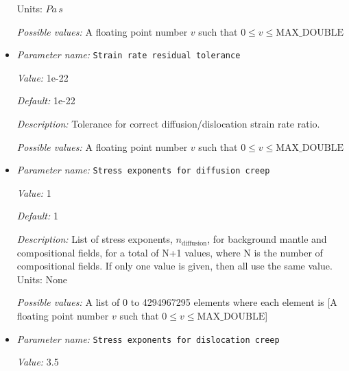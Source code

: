 \begin{itemize}
Units: $Pa \, s$


{\it Possible values:} A floating point number $v$ such that $0 \leq v \leq \text{MAX\_DOUBLE}$
\item {\it Parameter name:} {\tt Strain rate residual tolerance}
\label{parameters:Material model/Diffusion dislocation/Strain rate residual tolerance}
\label{parameters:Material_20model/Diffusion_20dislocation/Strain_20rate_20residual_20tolerance}


{\it Value:} 1e-22


{\it Default:} 1e-22


{\it Description:} Tolerance for correct diffusion/dislocation strain rate ratio.


{\it Possible values:} A floating point number $v$ such that $0 \leq v \leq \text{MAX\_DOUBLE}$
\item {\it Parameter name:} {\tt Stress exponents for diffusion creep}
\label{parameters:Material model/Diffusion dislocation/Stress exponents for diffusion creep}
\label{parameters:Material_20model/Diffusion_20dislocation/Stress_20exponents_20for_20diffusion_20creep}


{\it Value:} 1


{\it Default:} 1


{\it Description:} List of stress exponents, $n_{\text{diffusion}}$, for background mantle and compositional fields, for a total of N+1 values, where N is the number of compositional fields. If only one value is given, then all use the same value.  Units: None


{\it Possible values:} A list of 0 to 4294967295 elements where each element is [A floating point number $v$ such that $0 \leq v \leq \text{MAX\_DOUBLE}$]
\item {\it Parameter name:} {\tt Stress exponents for dislocation creep}
\label{parameters:Material model/Diffusion dislocation/Stress exponents for dislocation creep}
\label{parameters:Material_20model/Diffusion_20dislocation/Stress_20exponents_20for_20dislocation_20creep}


{\it Value:} 3.5



\end{itemize}
